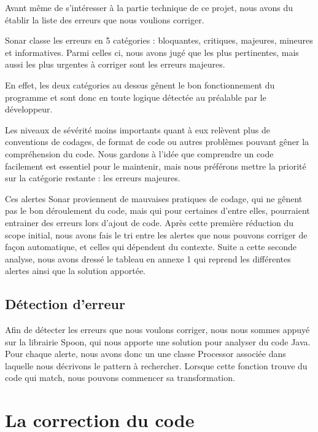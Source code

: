 \documentclass[a4paper]{article}
\begin{document}
\par Avant même de s'intéresser à la partie technique de ce projet, nous avons du établir la liste des erreurs que nous voulions corriger.
\\
\par Sonar classe les erreurs en 5 catégories : bloquantes, critiques, majeures, mineures et informatives. Parmi celles ci, nous avons jugé que les plus pertinentes, mais aussi les plus urgentes à corriger sont les erreurs majeures.
\\
\par En effet, les deux catégories au dessus gênent le bon fonctionnement du programme et sont donc en toute logique détectée au préalable par le développeur.
\\
\par Les niveaux de sévérité moins importants quant à eux relèvent plus de conventions de codages, de format de code ou autres problèmes pouvant gêner la compréhension du code. Nous gardons à l'idée que comprendre un code facilement est essentiel pour le maintenir, mais nous préférons mettre la priorité sur la catégorie restante : les erreurs majeures.
\\
\par Ces alertes Sonar proviennent de mauvaises pratiques de codage, qui ne gênent pas le bon déroulement du code, mais qui pour certaines d'entre elles, pourraient entrainer des erreurs lors d'ajout de code. Après cette première réduction du scope initial, nous avons fais le tri entre les alertes que nous pouvons corriger de façon automatique, et celles qui dépendent du contexte. Suite a cette seconde analyse, nous avons dressé le tableau en annexe 1 qui reprend les différentes alertes ainsi que la solution apportée.

\subsection{Détection d'erreur}
\par Afin de détecter les erreurs que nous voulons corriger, nous nous sommes appuyé sur la librairie Spoon, qui nous apporte une solution pour analyser du code Java. Pour chaque alerte, nous avons donc un une classe Processor associée dans laquelle nous décrivons le pattern à rechercher. Lorsque cette fonction trouve du code qui match, nous pouvons commencer sa transformation.

\section{La correction du code}
\end{document}
